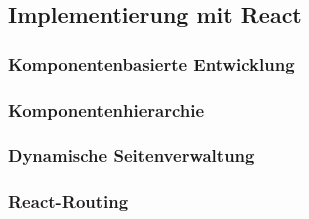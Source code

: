 \subsection{Implementierung mit React}
\subsubsection{Komponentenbasierte Entwicklung}
	
	
\subsubsection{Komponentenhierarchie}
	
\subsubsection{Dynamische Seitenverwaltung}
	
\subsubsection{React-Routing}
